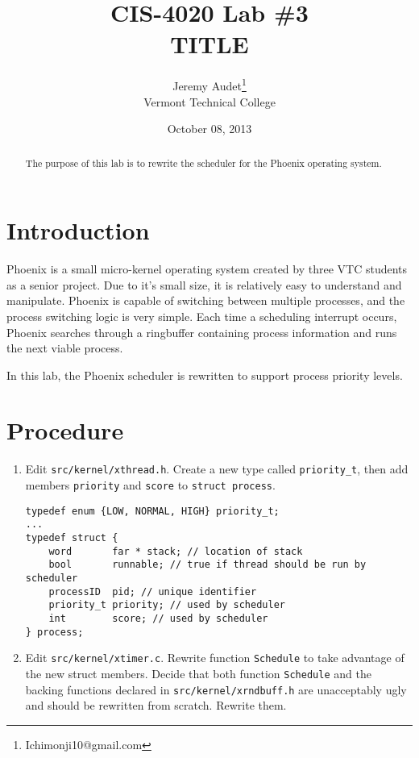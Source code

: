 \documentclass{article}
\begin{document}
\title{CIS-4020 Lab \#3\\TITLE}
\author{Jeremy Audet\thanks{Ichimonji10@gmail.com}\\
    Vermont Technical College}
    \date{October 08, 2013}
    \maketitle

\begin{abstract}
The purpose of this lab is to rewrite the scheduler for the Phoenix operating
system.
\end{abstract}

\section{Introduction}
\label{sec:introduction}

Phoenix is a small micro-kernel operating system created by three VTC students
as a senior project. Due to it's small size, it is relatively easy to understand
and manipulate. Phoenix is capable of switching between multiple processes, and
the process switching logic is very simple. Each time a scheduling interrupt
occurs, Phoenix searches through a ringbuffer containing process information and
runs the next viable process.

In this lab, the Phoenix scheduler is rewritten to support process priority
levels.

\section{Procedure}
\label{sec:procedure}

\begin{enumerate}
\item Edit \texttt{src/kernel/xthread.h}. Create a new type called
\texttt{priority\_t}, then add members \texttt{priority} and \texttt{score} to
\texttt{struct process}.
\begin{lstlisting}
typedef enum {LOW, NORMAL, HIGH} priority_t;
...
typedef struct {
    word       far * stack; // location of stack
    bool       runnable; // true if thread should be run by scheduler
    processID  pid; // unique identifier
    priority_t priority; // used by scheduler
    int        score; // used by scheduler
} process;
\end{lstlisting}

\item Edit \texttt{src/kernel/xtimer.c}. Rewrite function \texttt{Schedule} to
take advantage of the new struct members. Decide that both function
\texttt{Schedule} and the backing functions declared in
\texttt{src/kernel/xrndbuff.h} are unacceptably ugly and should be rewritten
from scratch. Rewrite them.
\end{enumerate}
\end{document}
